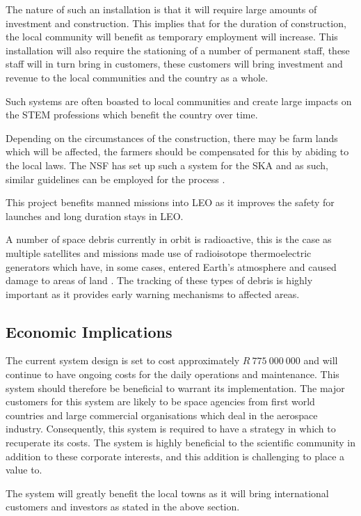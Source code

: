\documentclass[11pt]{witseiepaper}
\begin{document}
\begin{bibunit}[witseie]
The nature of such an installation is that it will require large amounts of investment and construction. This implies that for the duration of construction, the local community will benefit as temporary employment will increase. This installation will also require the stationing of a number of permanent staff, these staff will in turn bring in customers, these customers will bring investment and revenue to the local communities and the country as a whole.

Such systems are often boasted to local communities and create large impacts on the STEM professions which benefit the country over time.

Depending on the circumstances of the construction, there may be farm lands which will be affected, the farmers should be compensated for this by abiding to the local laws. The NSF has set up such a system for the SKA and as such, similar guidelines can be employed for the process \cite{SKAActDescription}.

This project benefits manned missions into LEO as it improves the safety for launches and long duration stays in LEO.

A number of space debris currently in orbit is radioactive, this is the case as multiple satellites and missions made use of radioisotope thermoelectric generators which have, in some cases, entered Earth's atmosphere and caused damage to areas of land \cite{RTG}. The tracking of these types of debris is highly important as it provides early warning mechanisms to affected areas.


\subsection{Economic Implications} \label{sec:EconomicImplications}
The current system design is set to cost approximately $R~775~000~000$ and will continue to have ongoing costs for the daily operations and maintenance.
This system should therefore be beneficial to warrant its implementation. The major customers for this system are likely to be space agencies from first world countries and large commercial organisations which deal in the aerospace industry.
Consequently, this system is required to have a strategy in which to recuperate its costs.
The system is highly beneficial to the scientific community in addition to these corporate interests, and this addition is challenging to place a value to.

The system will greatly benefit the local towns as it will bring international customers and investors as stated in the above section.


\end{bibunit}
\end{document}

